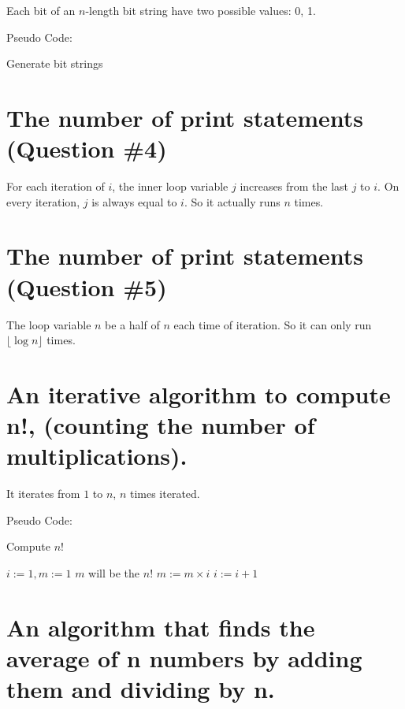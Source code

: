 \documentclass[12pt]{article}
\begin{document}
Each bit of an $n$-length bit string have two possible values: 0, 1.

Pseudo Code:
\begin{algorithm}
\caption{Generate bit strings}
\begin{algorithmic}[1]
			\State {}
		\Else
			\State {} 
			\State {}
		\EndIf
	\EndProcedure
\end{algorithmic}
\end{algorithm}

\section{The number of print statements (Question \#4)}

For each iteration of $i$, the inner loop variable $j$ increases from the last $j$ to $i$. On every iteration, $j$ is always equal to $i$. So it actually runs $n$ times.

\section{The number of print statements (Question \#5)}

The loop variable $n$ be a half of $n$ each time of iteration. So it can only run $\lfloor \log n \rfloor$ times.

\section{An iterative algorithm to compute n!, (counting the number of multiplications).}

It iterates from $1$ to $n$, $n$ times iterated.

Pseudo Code:
\begin{algorithm}
\caption{Compute $n!$}
\begin{algorithmic}[1] 
	\State $i := 1, m := 1$ \Comment $m$ will be the $n!$
		\State $ m := m \times i $
		\State $ i := i + 1 $
	\EndWhile
\end{algorithmic}
\end{algorithm}

\section{An algorithm that finds the average of n numbers by adding them and dividing by n.}
\end{document}
